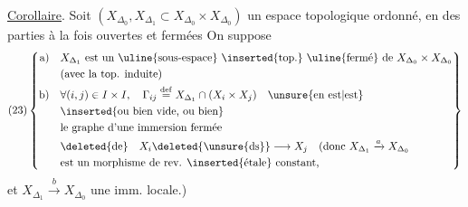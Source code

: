 \uline{Corollaire}. Soit $(X_{\Delta_0},X_{\Delta_1}\subset X_{\Delta_0}\times X_{\Delta_0})$
un espace topologique ordonné, 
 en des parties à la fois ouvertes et fermées
On suppose
\[
(23)\left\{\begin{aligned}
\text{a)}\quad &X_{\Delta_1}\text{ est un \uline{sous-espace} \inserted{top.} \uline{fermé} de }X_{\Delta_0}\times X_{\Delta_0}\\
&\text{(avec la top. induite)}\\
\text{b)}\quad &\forall(i,j)\in I\times I,\quad\Gamma_{ij}\overset{\mathrm{def}}{=}X_{\Delta_1}\cap(X_i\times X_j)\quad\text{\unsure{en est|est}}\\
&\text{\inserted{ou bien vide, ou bien}}\\
&\text{le graphe d'une immersion fermée}\\
&\deleted{\text{de}}\quad X_i\deleted{\text{\unsure{ds}}}\longrightarrow X_j
\quad\text{(donc }X_{\Delta_1}\xrightarrow{a}X_{\Delta_0}\\
&\text{est un morphisme de rev. \inserted{étale} constant,}
\end{aligned}\right\}
\]
 et $X_{\Delta_1}\xrightarrow{b}X_{\Delta_0}$ une imm. locale.)

